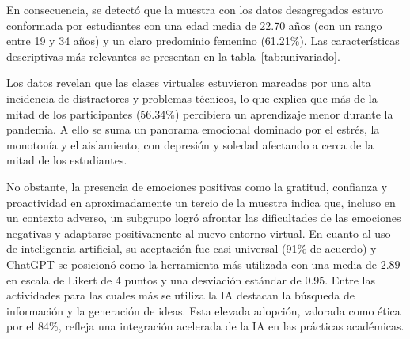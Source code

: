 \documentclass[conference]{IEEEtran}
\begin{document}
En consecuencia, se detectó que la muestra con los datos desagregados estuvo conformada por estudiantes con una edad media de 22.70 años (con un rango entre 19 y 34 años) y un claro predominio femenino (61.21\%). Las características descriptivas más relevantes se presentan en la tabla~\ref{tab:univariado}.

Los datos revelan que las clases virtuales estuvieron marcadas por una alta incidencia de distractores y problemas técnicos, lo que explica que más de la mitad de los participantes (56.34\%) percibiera un aprendizaje menor durante la pandemia. A ello se suma un panorama emocional dominado por el estrés, la monotonía y el aislamiento, con depresión y soledad afectando a cerca de la mitad de los estudiantes.

No obstante, la presencia de emociones positivas como la gratitud, confianza y proactividad en aproximadamente un tercio de la muestra indica que, incluso en un contexto adverso, un subgrupo logró afrontar las dificultades de las emociones negativas y adaptarse positivamente al nuevo entorno virtual. En cuanto al uso de inteligencia artificial, su aceptación fue casi universal (91\% de acuerdo) y ChatGPT se posicionó como la herramienta más utilizada con una media de $2.89$ en escala de Likert de 4 puntos y una desviación estándar de $0.95$. Entre las actividades para las cuales más se utiliza la IA destacan la búsqueda de información y la generación de ideas. Esta elevada adopción, valorada como ética por el 84\%, refleja una integración acelerada de la IA en las prácticas académicas.
\end{document}

